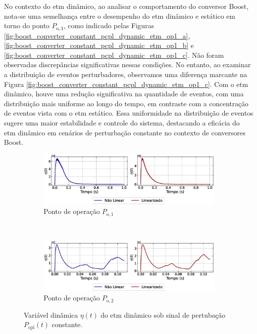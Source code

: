 No contexto do \acrshort{etm} dinâmico, ao analisar o comportamento do conversor Boost, nota-se uma semelhança entre o desempenho do \acrshort{etm} dinâmico e estático em torno do ponto $P_{\mathrm{o}, 3}$, como indicado pelas Figuras \ref{fig:boost_converter_constant_pcpl_dynamic_etm_op1_a}, \ref{fig:boost_converter_constant_pcpl_dynamic_etm_op1_b} e \ref{fig:boost_converter_constant_pcpl_dynamic_etm_op1_c}. Não foram observadas discrepâncias significativas nessas condições. No entanto, ao examinar a distribuição de eventos perturbadores, observamos uma diferença marcante na Figura \ref{fig:boost_converter_constant_pcpl_dynamic_etm_op1_c}. Com o \acrshort{etm} dinâmico, houve uma redução significativa na quantidade de eventos, com uma distribuição mais uniforme ao longo do tempo, em contraste com a concentração de eventos vista com o \acrshort{etm} estático. Essa uniformidade na distribuição de eventos sugere uma maior estabilidade e controle do sistema, destacando a eficácia do \acrshort{etm} dinâmico em cenários de perturbação constante no contexto de conversores Boost.

\begin{figure}[H]
  \centering
  \captionsetup{justification=centering}
  \begin{subfigure}{1.\textwidth}
    \centering
    \includegraphics[width=1.\textwidth]{figuras/dynamic-etm/boost/sim2/op1/eta.eps}
    \caption{Ponto de operação $P_{\mathrm{o}, 1}$}
  \end{subfigure}
  \\[6pt]
  \begin{subfigure}{1.\textwidth}
    \centering
    \includegraphics[width=1.\textwidth]{figuras/dynamic-etm/boost/sim2/op2/eta.eps}
    \caption{Ponto de operação $P_{\mathrm{o}, 2}$}
  \end{subfigure}
  \caption{Variável dinâmica $\eta(t)$ do \acrshort{etm} dinâmico sob sinal de pertubação $P_{\mathrm{cpl}}(t)$ constante.}
  \label{fig:boost_converter_constant_pcpl_dynamic_etm_eta}
\end{figure}

